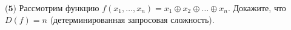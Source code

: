 ($\mathbf{5}$)
Рассмотрим функцию $f(x_1, \dots, x_n) = x_1 \oplus x_2 \oplus \dots \oplus x_n$. Докажите, что $D(f) = n$ (детерминированная
запросовая сложность).